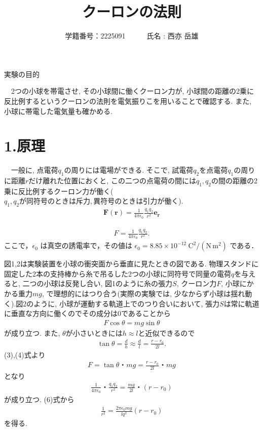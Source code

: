 \documentclass{jlreq}
\title{クーロンの法則}
\author{学籍番号：2225091~~~~~~氏名 : 西亦 岳雄}
\begin{document}
\maketitle


\begin{itembox}[l]{\large 実験の目的}

　2つの小球を帯電させ, その小球間に働くクーロン力が, 小球間の距離の2乗に反比例するというクーロンの法則を電気振りこを用いることで確認する. また, 小球に帯電した電気量も確かめる. 

\end{itembox}


\section*{1.原理}
　一般に, 点電荷$q_1$の周りには電場ができる. そこで, 試電荷$q_2$を点電荷$q_1$の周りに距離$r$だけ離れた位置におくと, この二つの点電荷の間には$q_1, q_2$の間の距離の2乗に反比例するクーロン力が働く($q_1,q_2が同符号のときは斥力, 異符号のときは引力が働く$). 
\begin{align}
    \bm{F}(\bm{r}) = \frac{1}{4\pi \epsilon_0} \frac{q_1 q_2}{r^2} \bm{e_r}
\end{align}

\begin{align}
    F = \frac{1}{4\pi \epsilon_0} \frac{q_1 q_2}{r^2}.
\end{align}
ここで，$\epsilon_0$ は真空の誘電率で，その値は $\epsilon_0 = 8.85 \times 10^{-12}\ \mathrm{C^2/(N\,m^2)}$ である．\par

図1,2は実験装置を小球の衝突面から垂直に見たときの図である. 物理スタンドに固定した2本の支持棒から糸で吊るした2つの小球に同符号で同量の電荷$q$を与えると, 二つの小球は反発し合い, 図1のように糸の張力$S$, クーロン力$F$, 小球にかかる重力$mg$, で理想的にはつり合う(実際の実験では, 少なからず小球は揺れ動く).図2のように, 小球が運動する軌道上でのつり合いにおいて, 張力$S$は常に軌道に垂直な方向に働くのでその成分は0であることから
\begin{align}
    F \cos \theta = mg \sin \theta
\end{align}
が成り立つ. また, $\theta$が小さいときには$h \approx l$と近似できるので
\begin{align}
    \tan \theta = \frac{d}{h} \approx \frac{d}{l} = \frac{r-r_0}{2l}.
\end{align}
(3),(4)式より
\begin{align}
    F = \tan \theta・mg = \frac{r-r_0}{2l}・mg
\end{align}
となり
\begin{align}
    \frac{1}{4\pi \epsilon_0}・\frac{q_1 q_2}{r^2} = \frac{mg}{2l}・(r-r_0)
\end{align}
が成り立つ. (6)式から
\begin{align}
    \frac{1}{r^2} = \frac{2\pi \epsilon_0 mg}{l q^2}(r-r_0)
\end{align}
を得る. 
\end{document}
